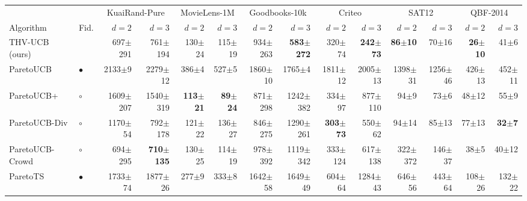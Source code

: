 \begin{tabular}{llrrrrrrrrrrrr}
\toprule
 & & \multicolumn{2}{c}{KuaiRand-Pure} & \multicolumn{2}{c}{MovieLens-1M} & \multicolumn{2}{c}{Goodbooks-10k} & \multicolumn{2}{c}{Criteo} & \multicolumn{2}{c}{SAT12} & \multicolumn{2}{c}{QBF-2014}\\
\cmidrule(lr){3-4}\cmidrule(lr){5-6}\cmidrule(lr){7-8}\cmidrule(lr){9-10}\cmidrule(lr){11-12}\cmidrule(lr){13-14}
Algorithm & Fid. & $d=2$ & $d=3$ & $d=2$ & $d=3$ & $d=2$ & $d=3$ & $d=2$ & $d=3$ & $d=2$ & $d=3$ & $d=2$ & $d=3$\\
\midrule
THV-UCB (ours) &  & 697{\scriptsize$\pm$291} & 761{\scriptsize$\pm$194} & 130{\scriptsize$\pm$24} & 115{\scriptsize$\pm$19} & 934{\scriptsize$\pm$263} & \textbf{583{\scriptsize$\pm$272}} & 320{\scriptsize$\pm$74} & \textbf{242{\scriptsize$\pm$73}} & \textbf{86{\scriptsize$\pm$10}} & 70{\scriptsize$\pm$16} & \textbf{26{\scriptsize$\pm$10}} & 41{\scriptsize$\pm$6}\\
\midrule
ParetoUCB & $\bullet$ & 2133{\scriptsize$\pm$9} & 2279{\scriptsize$\pm$12} & 386{\scriptsize$\pm$4} & 527{\scriptsize$\pm$5} & 1860{\scriptsize$\pm$10} & 1765{\scriptsize$\pm$4} & 1811{\scriptsize$\pm$12} & 2005{\scriptsize$\pm$13} & 1398{\scriptsize$\pm$31} & 1256{\scriptsize$\pm$46} & 426{\scriptsize$\pm$13} & 452{\scriptsize$\pm$11}\\
ParetoUCB+ & $\circ$ & 1609{\scriptsize$\pm$207} & 1540{\scriptsize$\pm$319} & \textbf{113{\scriptsize$\pm$21}} & \textbf{89{\scriptsize$\pm$24}} & 871{\scriptsize$\pm$298} & 1242{\scriptsize$\pm$382} & 334{\scriptsize$\pm$97} & 877{\scriptsize$\pm$110} & 94{\scriptsize$\pm$9} & 73{\scriptsize$\pm$6} & 48{\scriptsize$\pm$12} & 55{\scriptsize$\pm$9}\\
ParetoUCB-Div & $\circ$ & 1170{\scriptsize$\pm$54} & 792{\scriptsize$\pm$178} & 121{\scriptsize$\pm$22} & 136{\scriptsize$\pm$27} & 846{\scriptsize$\pm$275} & 1290{\scriptsize$\pm$261} & \textbf{303{\scriptsize$\pm$73}} & 550{\scriptsize$\pm$62} & 94{\scriptsize$\pm$14} & 85{\scriptsize$\pm$13} & 77{\scriptsize$\pm$13} & \textbf{32{\scriptsize$\pm$7}}\\
ParetoUCB-Crowd & $\circ$ & 694{\scriptsize$\pm$295} & \textbf{710{\scriptsize$\pm$135}} & 130{\scriptsize$\pm$25} & 114{\scriptsize$\pm$19} & 978{\scriptsize$\pm$392} & 1119{\scriptsize$\pm$342} & 333{\scriptsize$\pm$124} & 617{\scriptsize$\pm$138} & 322{\scriptsize$\pm$372} & 146{\scriptsize$\pm$37} & 38{\scriptsize$\pm$5} & 40{\scriptsize$\pm$12}\\
ParetoTS & $\bullet$ & 1733{\scriptsize$\pm$74} & 1877{\scriptsize$\pm$26} & 277{\scriptsize$\pm$9} & 333{\scriptsize$\pm$8} & 1642{\scriptsize$\pm$58} & 1649{\scriptsize$\pm$49} & 604{\scriptsize$\pm$64} & 1284{\scriptsize$\pm$43} & 646{\scriptsize$\pm$56} & 443{\scriptsize$\pm$64} & 108{\scriptsize$\pm$26} & 132{\scriptsize$\pm$22}\\

\end{tabular}
